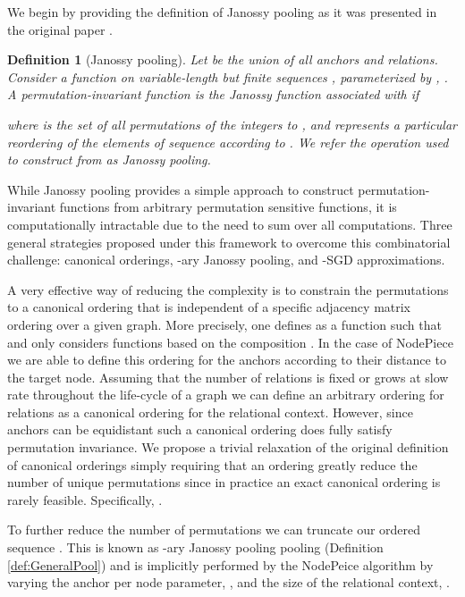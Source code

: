 \documentclass{article} \usepackage{iclr2022_conference,times}
\newcommand{\Janossy}{Janossy }
\newtheorem{definition}{Definition}
\begin{document}
We begin by providing the definition of Janossy pooling as it was presented in the original paper \cite{murphy2019janossy}.

\begin{definition}[\Janossy pooling]
\label{def:AnySizeDf}
Let  be the union of all anchors and relations. Consider a function  on variable-length but finite sequences , parameterized by , .
A permutation-invariant function  is the \Janossy function associated with  if

where  is the set of all permutations of the integers  to , and  represents a particular reordering of the elements of sequence  according to .
We refer the operation used to construct  from  as \Janossy pooling.
\end{definition}

While Janossy pooling provides a simple approach to construct permutation-invariant functions from arbitrary permutation sensitive functions, it is computationally intractable due to the need to sum over all computations. Three general strategies proposed under this framework to overcome this combinatorial challenge: canonical orderings, -ary Janossy pooling, and -SGD approximations.  

A very effective way of reducing the complexity is to constrain the permutations to a canonical ordering that is independent of a specific adjacency matrix ordering over a given graph.  More precisely, one defines as a function  such that  and only considers functions  based on the composition  \citep{murphy2019janossy}. In the case of NodePiece we are able to define this ordering for the anchors according to their distance to the target node. Assuming that the number of relations is fixed or grows at slow rate throughout the life-cycle of a graph we can define an arbitrary ordering for relations as a canonical ordering for the relational context. However, since anchors can be equidistant such a canonical ordering does fully satisfy permutation invariance. We propose a trivial relaxation of the original definition of canonical orderings simply requiring that an ordering greatly reduce the number of unique permutations since in practice an exact canonical ordering is rarely feasible. Specifically, .



To further reduce the number of permutations we can truncate our ordered sequence . This is known as -ary Janossy pooling pooling (Definition \ref{def:GeneralPool}) and is implicitly performed by the NodePeice algorithm by varying the anchor per node parameter, , and the size of the relational context, .
\end{document}
